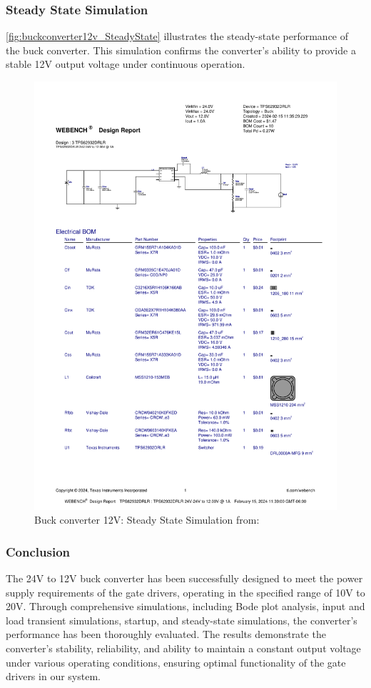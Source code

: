 \subsubsection{Steady State Simulation}
\autoref{fig:buckconverter12v_SteadyState} illustrates the steady-state performance of the buck converter. This simulation confirms the converter's ability to provide a stable 12V output voltage under continuous operation.
\begin{figure}[H]
    \centering
    \includegraphics[trim=0 200 0 70,clip,width=0.8\linewidth,page=8]{img//buckconverters//12v/WBDesign3_Steady State.pdf}
    \caption{Buck converter 12V: Steady State Simulation from: %
    }
    \label{fig:buckconverter12v_SteadyState}
\end{figure}

\subsubsection{Conclusion}
The 24V to 12V buck converter has been successfully designed to meet the power supply requirements of the gate drivers, operating in the specified range of 10V to 20V. Through comprehensive simulations, including Bode plot analysis, input and load transient simulations, startup, and steady-state simulations, the converter's performance has been thoroughly evaluated. The results demonstrate the converter's stability, reliability, and ability to maintain a constant output voltage under various operating conditions, ensuring optimal functionality of the gate drivers in our system.


